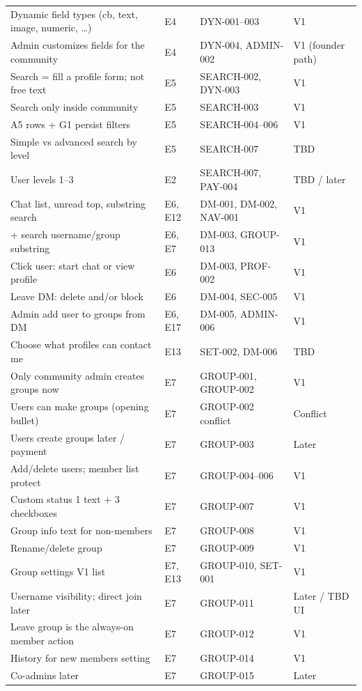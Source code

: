 \documentclass[11pt,a4paper]{article}
\begin{document}
\begin{longtable}{@{}p{5.8cm}p{2.0cm}p{3.4cm}p{2.4cm}@{}}
Dynamic field types (cb, text, image, numeric, \ldots) & E4 & DYN-001--003 & V1 \\
Admin customizes fields for the community & E4 & DYN-004, ADMIN-002 & V1 (founder path) \\
Search = fill a profile form; not free text & E5 & SEARCH-002, DYN-003 & V1 \\
Search only inside community & E5 & SEARCH-003 & V1 \\
A5 rows + G1 persist filters & E5 & SEARCH-004--006 & V1 \\
Simple vs advanced search by level & E5 & SEARCH-007 & TBD \\
User levels 1--3 & E2 & SEARCH-007, PAY-004 & TBD / later \\
Chat list, unread top, substring search & E6, E12 & DM-001, DM-002, NAV-001 & V1 \\
+ search username/group substring & E6, E7 & DM-003, GROUP-013 & V1 \\
Click user: start chat or view profile & E6 & DM-003, PROF-002 & V1 \\
Leave DM: delete and/or block & E6 & DM-004, SEC-005 & V1 \\
Admin add user to groups from DM & E6, E17 & DM-005, ADMIN-006 & V1 \\
Choose what profiles can contact me & E13 & SET-002, DM-006 & TBD \\
Only community admin creates groups now & E7 & GROUP-001, GROUP-002 & V1 \\
Users can make groups (opening bullet) & E7 & GROUP-002 conflict & Conflict \\
Users create groups later / payment & E7 & GROUP-003 & Later \\
Add/delete users; member list protect & E7 & GROUP-004--006 & V1 \\
Custom status 1 text + 3 checkboxes & E7 & GROUP-007 & V1 \\
Group info text for non-members & E7 & GROUP-008 & V1 \\
Rename/delete group & E7 & GROUP-009 & V1 \\
Group settings V1 list & E7, E13 & GROUP-010, SET-001 & V1 \\
Username visibility; direct join later & E7 & GROUP-011 & Later / TBD UI \\
Leave group is the always-on member action & E7 & GROUP-012 & V1 \\
History for new members setting & E7 & GROUP-014 & V1 \\
Co-admins later & E7 & GROUP-015 & Later \\

\end{longtable}
\end{document}
